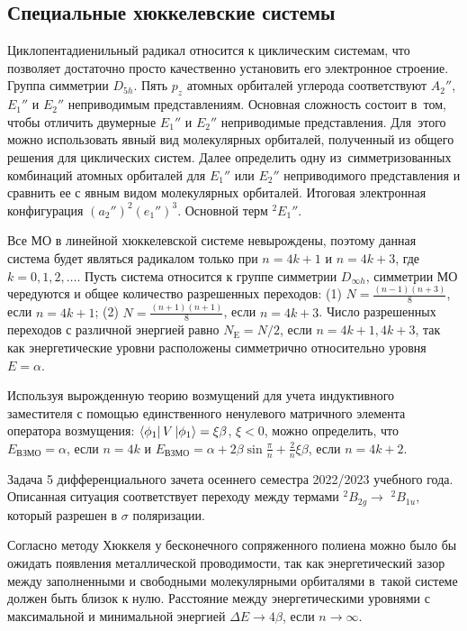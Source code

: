 \subsection{Специальные хюккелевские системы}
 Циклопентадиенильный радикал относится к циклическим системам, что позволяет достаточно просто качественно установить его электронное строение. Группа симметрии $D_{5h}$. Пять $p_z$ атомных орбиталей углерода соответствуют $A_2''$, $E_1''$ и $E_2''$ неприводимым представлениям. Основная сложность состоит в~том, чтобы отличить двумерные $E_1''$ и $E_2''$ неприводимые представления. Для~этого можно использовать явный вид молекулярных орбиталей, полученный из общего решения для циклических систем. Далее определить одну из~симметризованных комбинаций атомных орбиталей для $E_1''$ или $E_2''$ неприводимого представления и сравнить ее с явным видом молекулярных орбиталей. Итоговая электронная конфигурация $(a_{2}'')^2(e_1'')^3$. Основной терм $^2E_{1}''$.\par
{} Все МО в линейной хюккелевской системе невырождены, поэтому данная система будет являться радикалом только при $n=4k+1$ и $n=4k+3$, где $k=0\text{,}\,1\text{,}\,2\text{,}\,\ldots$. Пусть система относится к группе симметрии $D_{\infty h}$, симметрии МО чередуются и общее количество разрешенных переходов: (1) $N=\frac{(n-1)(n+3)}{8}$, если $n=4k+1$; (2) $N=\frac{(n+1)(n+1)}{8}$, если $n=4k+3$. Число разрешенных переходов с различной энергией равно $N_{\text{E}}=N/2$, если $n = 4k+1\text{,}\,4k+3$, так как энергетические уровни расположены симметрично относительно уровня $E=\alpha$.\par
{} Используя вырожденную теорию возмущений для учета индуктивного заместителя с помощью единственного ненулевого матричного элемента оператора возмущения: $\bra{\phi_1} V \ket{\phi_1}=\xi \beta$, $\xi<0$, можно определить, что $E_{\text{ВЗМО}}=\alpha$, если $n=4k$ и $E_{\text{ВЗМО}}=\alpha+2\beta \sin{\frac{\pi}{n}}+\frac{2}{n}\xi \beta$, если $n=4k+2$.\par
{} Задача 5 дифференциального зачета осеннего семестра 2022/2023 учебного года. Описанная ситуация соответствует переходу между термами $^2B_{2g} \rightarrow\,\,^2B_{1u}$, который разрешен в $\sigma$ поляризации.\par
{} Согласно методу Хюккеля у бесконечного сопряженного полиена можно было бы ожидать появления металлической проводимости, так как энергетический зазор между заполненными и свободными молекулярными орбиталями в~такой системе должен быть близок к нулю. Расстояние между энергетическими уровнями с максимальной и минимальной энергией $\Delta E \rightarrow 4\beta$, если $n \rightarrow \infty$. \par
